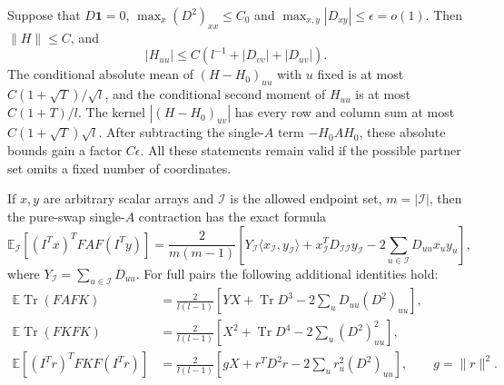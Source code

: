 \begin{lemma}
\label{lem:boundary-pair-averages}
Suppose that $D\mathbf1=0$,
$\max_x(D^2)_{xx}\le C_0$ and
$\max_{x,y}|D_{xy}|\le\epsilon=o(1)$.
Then $\|H\|\le C$, and
\[
 |H_{uu}|\le C(l^{-1}+|D_{vv}|+|D_{uv}|).
\]
The conditional absolute mean of $(H-H_0)_{uu}$ with $u$ fixed is
at most $C(1+\sqrt T)/\sqrt l$, and the conditional second moment
of $H_{uu}$ is at most $C(1+T)/l$.
The kernel $|(H-H_0)_{uv}|$ has every row and column sum at most
$C(1+\sqrt T)\sqrt l$.  After subtracting the single-$A$ term
$-H_0AH_0$, these absolute bounds gain a factor $C\epsilon$.
All these statements remain valid if the possible partner set omits
a fixed number of coordinates.

If $x,y$ are arbitrary scalar arrays and $\mathcal I$ is the allowed
endpoint set, $m=|\mathcal I|$, then the pure-swap single-$A$
contraction has the exact formula
\[
 \mathbb E_{\mathcal I}
     [(I^Tx)^TF A F(I^Ty)]
 =\frac{2}{m(m-1)}\left[
   Y_{\mathcal I}\langle x_{\mathcal I},y_{\mathcal I}\rangle
  +x_{\mathcal I}^TD_{\mathcal I\mathcal I}y_{\mathcal I}
  -2\sum_{u\in\mathcal I}D_{uu}x_uy_u\right],
\]
where $Y_{\mathcal I}=\sum_{u\in\mathcal I}D_{uu}$.
For full pairs the following additional identities hold:
\begin{align*}
 \mathbb E\operatorname{Tr}(F A F K)
 &=\frac{2}{l(l-1)}
    \left[YX+\operatorname{Tr}D^3
                 -2\sum_uD_{uu}(D^2)_{uu}\right],\\
 \mathbb E\operatorname{Tr}(F K F K)
 &=\frac{2}{l(l-1)}
    \left[X^2+\operatorname{Tr}D^4
                 -2\sum_u(D^2)_{uu}^2\right],\\
 \mathbb E[(I^Tr)^TF K F(I^Tr)]
 &=\frac{2}{l(l-1)}
    \left[gX+r^TD^2r-2\sum_ur_u^2(D^2)_{uu}\right],
 \qquad g=\|r\|^2.
\end{align*}
\end{lemma}

